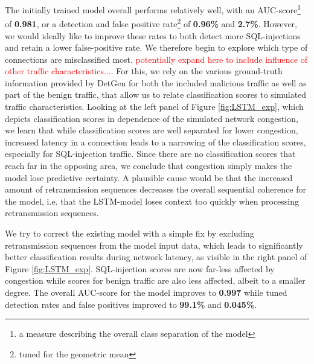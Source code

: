 \documentclass[sigconf]{acmart}
\begin{document}
The initially trained model overall performs relatively well, with an AUC-score\footnote{a measure describing the overall class separation of the model} of \textbf{0.981}, or a detection and false positive rate\footnote{tuned for the geometric mean} of \textbf{0.96\%} and \textbf{2.7\%}. However, we would ideally like to improve these rates to both detect more SQL-injections and retain a lower false-positive rate. We therefore begin to explore which type of connections are misclassified most. \textcolor{red}{potentially expand here to include influence of other traffic characteristics...}. For this, we rely on the various ground-truth information provided by DetGen for both the included malicious traffic as well as part of the benign traffic, that allow us to relate classification scores to simulated traffic characteristics. Looking at the left panel of Figure \ref{fig:LSTM_exp}, which depicts classification scores in dependence of the simulated network congestion, we learn that while classification scores are well separated for lower congestion, increased latency in a connection leads to a narrowing of the classification scores, especially for SQL-injection traffic. Since there are no classification scores that reach far in the opposing area, we conclude that congestion simply makes the model lose predictive certainty. A plausible cause would be that the increased amount of retransmission sequences decreases the overall sequential coherence for the model, i.e. that the LSTM-model loses context too quickly when processing retransmission sequences. 

We try to correct the existing model with a simple fix by excluding retransmission sequences from the model input data, which leads to significantly better classification results during network latency, as visible in the right panel of Figure \ref{fig:LSTM_exp}. SQL-injection scores are now far-less affected by congestion while scores for benign traffic are also less affected, albeit to a smaller degree.
The overall AUC-score for the model improves to \textbf{0.997} while tuned detection rates and false positives improved to \textbf{99.1\%} and \textbf{0.045\%}.



\end{document}
